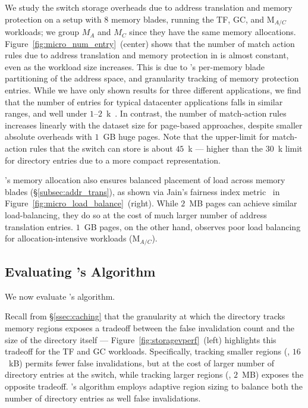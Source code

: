  We study the switch storage overheads due to address translation and memory protection on a setup with 8 memory blades, running the TF, GC, and M$_{A/C}$ workloads; we group $M_A$ and $M_C$ since they have the same memory allocations. Figure~\ref{fig:micro_num_entry}~(center) shows that the number of match action rules due to address translation and memory protection in \mind is almost constant, even as the workload size increases. This is due to \mind's per-memory blade partitioning of the address space, and  granularity tracking of memory protection entries. While we have only shown results for three different applications, we find that the number of  entries for typical datacenter applications falls in similar ranges, and well under $1$--$2$~k~\cite{vma1, vma2}. In contrast, the number of match-action rules increases linearly with the dataset size for page-based approaches, despite smaller absolute overheads with $1$~GB huge pages. Note that the upper-limit for match-action rules that the switch can store is about $45$~k --- higher than the $30$~k limit for directory entries due to a more compact representation.

\mind's memory allocation also ensures balanced placement of load across memory blades (\S\ref{subsec:addr_trans}), as shown via Jain's fairness index metric~\cite{jain} in Figure~\ref{fig:micro_load_balance}~(right). While $2$~MB pages can achieve similar load-balancing, they do so at the cost of much larger number of address translation entries. $1$~GB pages, on the other hand, observes poor load balancing for allocation-intensive workloads (M$_{A/C}$).

\subsection{Evaluating \mind's \mindAlgo Algorithm}
\label{ssec:mindsensitivity}

We now evaluate \mind's \mindalgo algorithm.

 Recall from \S\ref{ssec:caching} that the granularity at which the directory tracks memory regions exposes a tradeoff between the false invalidation count and the size of the directory itself --- Figure~\ref{fig:storagevperf}~(left) highlights this tradeoff for the TF and GC workloads. Specifically, tracking smaller regions (\eg, $16$~kB) permits fewer false invalidations, but at the cost of larger number of directory entries at the switch, while tracking larger regions (\eg, $2$~MB) exposes the opposite tradeoff. \mind's \mindalgo algorithm employs adaptive region sizing to balance both the number of directory entries as well false invalidations.

